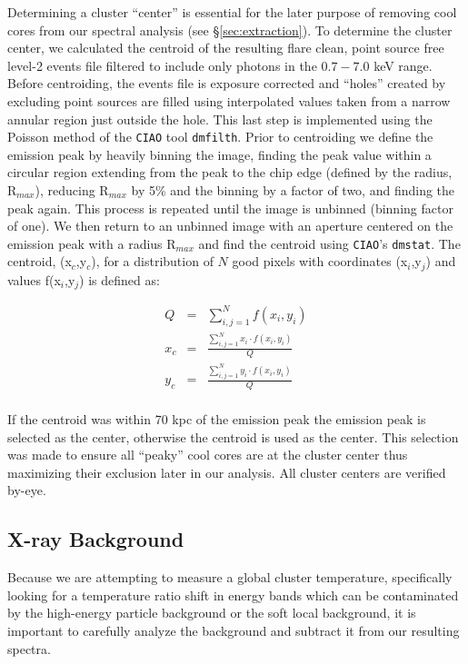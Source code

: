 \documentclass{emulateapj}
\begin{document}
Determining a cluster ``center'' is essential for the later purpose of
removing cool cores from our spectral analysis (see
\S\ref{sec:extraction}). To determine the cluster center, we
calculated the centroid of the resulting flare clean, point source
free level-2 events file filtered to include only photons in the
$0.7-7.0$ keV range. Before centroiding, the events file is exposure
corrected and ``holes'' created by excluding point sources are filled
using interpolated values taken from a narrow annular region just
outside the hole. This last step is implemented using the Poisson
method of the {\tt CIAO} tool {\tt dmfilth}. Prior to centroiding we define
the emission peak by heavily binning the image, finding the peak value
within a circular region extending from the peak to the chip edge
(defined by the radius, R$_{max}$), reducing R$_{max}$ by 5\%
and the binning by a factor of two, and finding the peak again. This
process is repeated until the image is unbinned (binning factor of
one). We then return to an unbinned image with an aperture centered on
the emission peak with a radius R$_{max}$ and find the centroid using
{\tt CIAO}'s {\tt dmstat}. The centroid, (x$_c$,y$_c$), for a
distribution of $N$ good pixels with coordinates (x$_i$,y$_j$) and
values f(x$_i$,y$_j$) is defined as:

\begin{eqnarray}
Q &=& \sum_{i,j=1}^N f(x_i,y_i) \\
x_c &=& \frac{\sum_{i,j=1}^N x_i \cdot f(x_i,y_i)}{Q} \nonumber \\
y_c &=& \frac{\sum_{i,j=1}^N y_i \cdot f(x_i,y_i)}{Q} \nonumber \\
\end{eqnarray}

If the centroid was within 70 kpc of the emission peak the emission
peak is selected as the center, otherwise the centroid is used
as the center. This selection was made to ensure all ``peaky'' cool
cores are at the cluster center thus maximizing their exclusion later
in our analysis. All cluster centers are verified by-eye.

\subsection{X-ray Background} \label{sec:background}

Because we are attempting to measure a global cluster temperature,
specifically looking for a temperature ratio shift in energy bands
which can be contaminated by the high-energy particle background or
the soft local background, it is important to carefully analyze the
background and subtract it from our resulting spectra.
\end{document}
